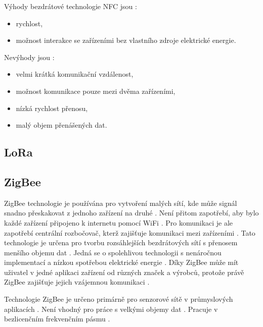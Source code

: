 Výhody bezdrátové technologie NFC jsou \cite{Bezdrat_muni}:
\begin{itemize}
  \item rychlost, %
  \item možnost interakce se zařízeními bez vlastního zdroje elektrické energie.
\end{itemize}

Nevýhody jsou \cite{Bezdrat_muni}:
\begin{itemize}
  \item velmi krátká komunikační vzdálenost,
  \item možnost komunikace pouze mezi dvěma zařízeními, 
  \item nízká rychlost přenosu,
  \item malý objem přenášených dat.
\end{itemize}

\subsection{LoRa}



\subsection{ZigBee} %
ZigBee technologie je používána pro vytvoření malých sítí, kde může signál snadno přeskakovat z jednoho zařízení na druhé \cite{ZigBee_smart}.
Není přitom zapotřebí, aby bylo každé zařízení připojeno k internetu pomocí WiFi \cite{ZigBee_smart}. Pro komunikaci je ale zapotřebí centrální 
rozbočovač, kterž zajišťuje komunikaci mezi zařízeními \cite{ZigBee_smart}. Tato technologie je určena pro tvorbu rozsáhlejších bezdrátových sítí
s přenosem menšího objemu dat \cite{ZigBee_smart}. Jedná se o spolehlivou technologii s nenáročnou implementací a nízkou spotřebou elektrické energie 
\cite{ZigBee_smart}. Díky ZigBee může mít uživatel v jedné aplikaci zařízení 
od různých značek a výrobců, protože právě ZigBee zajišťuje jejich vzájemnou komunikaci \cite{ZigBee_smart}.

Technologie ZigBee je určeno primárně pro senzorové sítě v průmyslových aplikacích \cite{Bezdrat_muni}. Není vhodný pro práce s velkými objemy dat \cite{Bezdrat_muni}.
Pracuje v bezlicenčním frekvenčním pásmu \cite{Bezdrat_muni}.


